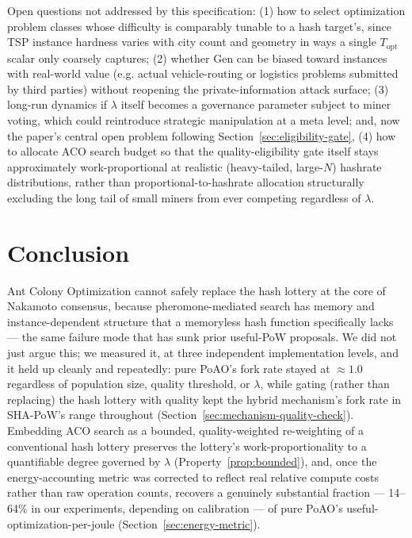 \documentclass[journal]{IEEEtran}
\begin{document}
Open questions not addressed by this specification: (1) how to select
optimization problem classes whose difficulty is comparably tunable to a hash
target's, since TSP instance hardness varies with city count and geometry in
ways a single $T_{\text{opt}}$ scalar only coarsely captures; (2) whether
$\mathrm{Gen}$ can be biased toward instances with real-world value (e.g.
actual vehicle-routing or logistics problems submitted by third parties)
without reopening the private-information attack surface; (3) long-run
dynamics if $\lambda$ itself becomes a governance parameter subject to miner
voting, which could reintroduce strategic manipulation at a meta level; and,
now the paper's central open problem following Section~\ref{sec:eligibility-gate},
(4) how to allocate ACO search budget so that the quality-eligibility gate
itself stays approximately work-proportional at realistic (heavy-tailed,
large-$N$) hashrate distributions, rather than proportional-to-hashrate
allocation structurally excluding the long tail of small miners from ever
competing regardless of $\lambda$.

\section{Conclusion}

Ant Colony Optimization cannot safely replace the hash lottery at the core of
Nakamoto consensus, because pheromone-mediated search has memory and
instance-dependent structure that a memoryless hash function specifically
lacks --- the same failure mode that has sunk prior useful-PoW proposals. We
did not just argue this; we measured it, at three independent
implementation levels, and it held up cleanly and repeatedly: pure PoAO's
fork rate stayed at $\approx 1.0$ regardless of population size, quality
threshold, or $\lambda$, while gating (rather than replacing) the hash
lottery with quality kept the hybrid mechanism's fork rate in SHA-PoW's
range throughout (Section~\ref{sec:mechanism-quality-check}). Embedding ACO
search as a bounded, quality-weighted re-weighting of a conventional hash
lottery preserves the lottery's work-proportionality to a quantifiable
degree governed by $\lambda$ (Property~\ref{prop:bounded}), and, once the
energy-accounting metric was corrected to reflect real relative compute
costs rather than raw operation counts, recovers a genuinely substantial
fraction --- 14--64\% in our experiments, depending on calibration --- of
pure PoAO's useful-optimization-per-joule (Section~\ref{sec:energy-metric}).
\end{document}
